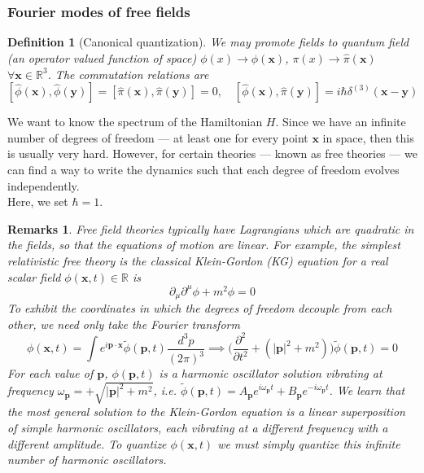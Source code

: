 \documentclass[a4paper]{article}
\newtheorem{remarks}{Remarks}[section]
\theoremstyle{new}
\newtheorem{defi}{Definition}[section]
\begin{document}
\subsubsection{Fourier modes of free fields}
\begin{defi}[Canonical quantization]
We may promote fields to quantum field (an operator valued function of space) $\phi(x)\rightarrow\hat{\phi}(\mathbf{x})$, $\pi(x)\rightarrow\hat{\pi}(\mathbf{x})$ $\forall\mathbf{x}\in\mathbb{R}^3$. The commutation relations are
$$[\hat{\phi}(\mathbf{x}),\hat{\phi}(\mathbf{y})]=[\hat{\pi}(\mathbf{x}),\hat{\pi}(\mathbf{y})]=0,\quad[\hat{\phi}(\mathbf{x}),\hat{\pi}(\mathbf{y})]=i\hbar\delta^{(3)}(\mathbf{x}-\mathbf{y})$$
\end{defi}
We want to know the spectrum of the Hamiltonian $H$. Since we have an infinite number of degrees of freedom — at least one for every point $\mathbf{x}$ in space, then this is usually very hard. However, for certain theories — known as free theories — we can find a way to write the dynamics such that each degree of freedom evolves independently.\\[5pt]
Here, we set $\hbar=1$.
\begin{remarks}
Free field theories typically have Lagrangians which are quadratic in the fields, so that the equations of motion are linear. For example, the simplest relativistic free theory is the classical Klein-Gordon (KG) equation for a real scalar field $\phi(\mathbf{x},t)\in\mathbb{R}$ is
$$\partial_\mu\partial^\mu\phi+m^2\phi=0$$
To exhibit the coordinates in which the degrees of freedom decouple from each other, we need only take the Fourier transform
$$\phi(\mathbf{x},t)=\int e^{i\mathbf{p}\cdot\mathbf{x}}\tilde{\phi}(\mathbf{p},t)\frac{d^3p}{(2\pi)^3}\implies\bigg(\frac{\partial^2}{\partial t^2}+(|\mathbf{p}|^2+m^2)\bigg)\tilde{\phi}(\mathbf{p},t)=0$$
For each value of $\mathbf{p}$, $\phi(\mathbf{p},t)$ is a harmonic oscillator solution vibrating at frequency $\omega_\mathbf{p}=+\sqrt{|\mathbf{p}|^2+m^2}$, i.e. $\tilde{\phi}(\mathbf{p},t)=A_{\mathbf{p}}e^{i\omega_{\mathbf{p}}t}+B_{\mathbf{p}}e^{-i\omega_{\mathbf{p}}t}$. We learn that the most general solution to the Klein-Gordon equation is a linear superposition of simple harmonic oscillators, each vibrating at a different frequency with a different amplitude. To quantize $\phi(\mathbf{x},t)$ we must simply quantize this infinite number of harmonic oscillators. 
\end{remarks}
\end{document}
